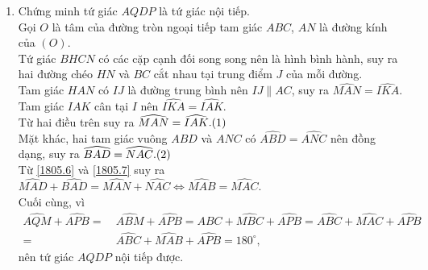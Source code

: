 \begin{ex}
{\begin{enumerate}
{Do đó $\dfrac{MB}{MC}=\dfrac{MD}{MA}\Rightarrow MA\cdot MB=MC\cdot MD$.
}{
}
Trở lại bài toán, do tứ giác $CDHE$ có hai đỉnh $D$ và $E$ cùng nhìn đoạn $CH$ dưới một góc vuông nên nó nội tiếp được, áp dụng bổ đề ta được
\begin{align}
BE\cdot BH=BC\cdot BD\Rightarrow BE\cdot BH\cdot CD=BC\cdot BD\cdot CD.\label{1805.4}
\end{align}
Tương tự, tứ giác $ABDE$ nội tiếp được nên
\begin{align}
CA\cdot CE=CD\cdot CB\Rightarrow CA\cdot CE\cdot BD=CD\cdot CB\cdot BD.\label{1805.5}
\end{align}
Từ \eqref{1805.4} và \eqref{1805.5} suy ra
$$BE\cdot BH\cdot CD=CA\cdot CE\cdot BD.$$
\item Chứng minh tứ giác $AQDP$ là tứ giác nội tiếp.\\
Gọi $O$ là tâm của đường tròn ngoại tiếp tam giác $ABC$, $AN$ là đường kính của $(O)$.\\
Tứ giác $BHCN$ có các cặp cạnh đối song song nên là hình bình hành, suy ra hai đường chéo $HN$ và $BC$ cắt nhau tại trung điểm $J$ của mỗi đường.\\
Tam giác $HAN$ có $IJ$ là đường trung bình nên $IJ\parallel AC$, suy ra $\widehat{MAN}=\widehat{IKA}$.\\
Tam giác $IAK$ cân tại $I$ nên $\widehat{IKA}=\widehat{IAK}$.\\
Từ hai điều trên suy ra $\widehat{MAN}=\widehat{IAK}. \refstepcounter{equation}\hfill (\theequation)\label{1805.6}$\\
Mặt khác, hai tam giác vuông $ABD$ và $ANC$ có $\widehat{ABD}=\widehat{ANC}$ nên đồng dạng, suy ra $\widehat{BAD}=\widehat{NAC}. \refstepcounter{equation}\hfill (\theequation)\label{1805.7}$\\
Từ \eqref{1805.6} và \eqref{1805.7} suy ra $\widehat{MAD}+\widehat{BAD}=\widehat{MAN}+\widehat{NAC}\Leftrightarrow \widehat{MAB}=\widehat{MAC}$.\\
Cuối cùng, vì
\begin{align*}
\widehat{AQM}+\widehat{APB}=\ & \widehat{ABM}+\widehat{APB}=\widehat{ABC}+\widehat{MBC}+\widehat{APB}=\widehat{ABC}+\widehat{MAC}+\widehat{APB}\\
=\ & \widehat{ABC}+\widehat{MAB}+\widehat{APB}=180^\circ,
\end{align*}
nên tứ giác $AQDP$ nội tiếp được.
\end{enumerate}
}
\end{ex}



